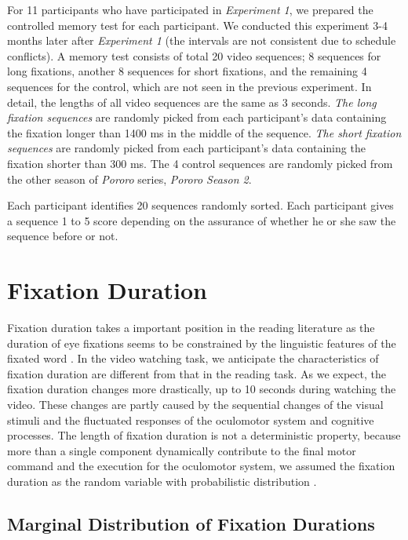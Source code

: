 \documentclass[10pt,letterpaper]{article}
\begin{document}
For 11 participants who have participated in \textit{Experiment 1}, we prepared the controlled memory test for each participant. We conducted this experiment 3-4 months later after \textit{Experiment 1} (the intervals are not consistent due to schedule conflicts). A memory test consists of total 20 video sequences; 8 sequences for long fixations, another 8 sequences for short fixations, and the remaining 4 sequences for the control, which are not seen in the previous experiment. In detail, the lengths of all video sequences are the same as 3 seconds. \textit{The long fixation sequences} are randomly picked from each participant's data containing the fixation longer than 1400 ms in the middle of the sequence. \textit{The short fixation sequences} are randomly picked from each participant's data containing the fixation shorter than 300 ms. The 4 control sequences are randomly picked from the other season of \textit{Pororo} series, \textit{Pororo Season 2}.

Each participant identifies 20 sequences randomly sorted. Each participant gives a sequence 1 to 5 score depending on the assurance of whether he or she saw the sequence before or not. 

\section{Fixation Duration}
\label{sec:fixation-duration}

Fixation duration takes a important position in the reading literature as the duration of eye fixations seems to be constrained by the linguistic features of the fixated word \cite{Rayner1986,Inhoff1986}. In the video watching task, we anticipate the characteristics of fixation duration are different from that in the reading task. As we expect, the fixation duration changes more drastically, up to 10 seconds during watching the video. These changes are partly caused by the sequential changes of the visual stimuli and the fluctuated responses of the oculomotor system and cognitive processes. The length of fixation duration is not a deterministic property, because more than a single component dynamically contribute to the final motor command and the execution for the oculomotor system, we assumed the fixation duration as the random variable with probabilistic distribution \cite{Rayner1998,Reichle2004,Reichle2006}.

\subsection{Marginal Distribution of Fixation Durations}
\end{document}
